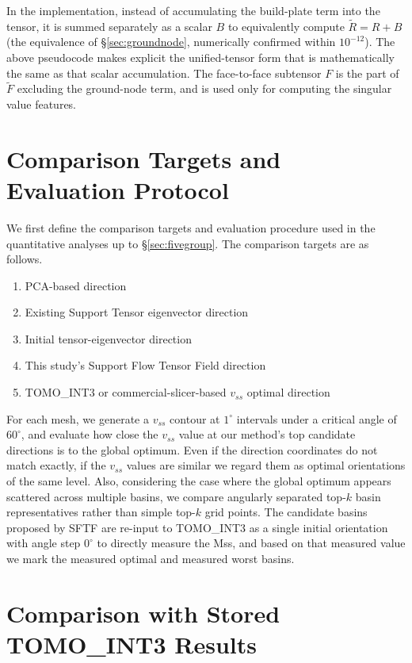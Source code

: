 \documentclass[11pt,a4paper]{article}
\begin{document}
In the implementation, instead of accumulating the build-plate term into the tensor, it is summed separately as a scalar $B$
to equivalently compute $\tilde R=R+B$ (the equivalence of \S\ref{sec:groundnode}, numerically confirmed within $10^{-12}$).
The above pseudocode makes explicit the unified-tensor form that is mathematically the same as that scalar accumulation.
The face-to-face subtensor $F$ is the part of $\tilde F$ excluding the ground-node term, and is used only for computing the singular value features.

\section{Comparison Targets and Evaluation Protocol}
\label{sec:protocol}

We first define the comparison targets and evaluation procedure used in the quantitative analyses up to \S\ref{sec:fivegroup}.
The comparison targets are as follows.

\begin{enumerate}
\item PCA-based direction
\item Existing Support Tensor eigenvector direction
\item Initial tensor-eigenvector direction
\item This study's Support Flow Tensor Field direction
\item TOMO\_INT3 or commercial-slicer-based $v_{ss}$ optimal direction
\end{enumerate}

For each mesh, we generate a $v_{ss}$ contour at $1^\circ$ intervals under a critical angle of $60^\circ$,
and evaluate how close the $v_{ss}$ value at our method's top candidate directions is to the global optimum.
Even if the direction coordinates do not match exactly, if the $v_{ss}$ values are similar we regard them as optimal orientations of the same level.
Also, considering the case where the global optimum appears scattered across multiple basins,
we compare angularly separated top-$k$ basin representatives rather than simple top-$k$ grid points.
The candidate basins proposed by SFTF are re-input to TOMO\_INT3 as a single initial orientation with angle step $0^\circ$
to directly measure the Mss,
and based on that measured value we mark the measured optimal and measured worst basins.

\section{Comparison with Stored TOMO\_INT3 Results}
\end{document}

